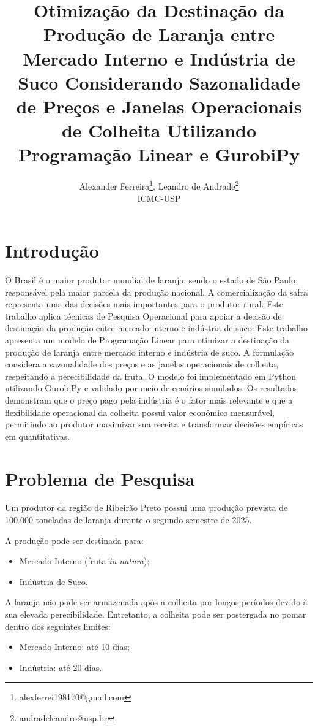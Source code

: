 \documentclass{wmecai}
\title{Otimização da Destinação da Produção de Laranja entre Mercado Interno e Indústria de Suco Considerando Sazonalidade de Preços e Janelas Operacionais de Colheita Utilizando Programação Linear e GurobiPy}
\author{
Alexander Ferreira\thanks{alexferrei198170@gmail.com}, 
Leandro de Andrade\thanks{andradeleandro@usp.br} 
\\
ICMC-USP
}
\date{}
\begin{document}
\criartitulo

\section{Introdução}
O Brasil é o maior produtor mundial de laranja, sendo o estado de São Paulo responsável pela maior parcela da produção nacional. A comercialização da safra representa uma das decisões mais importantes para o produtor rural. Este trabalho aplica técnicas de Pesquisa Operacional para apoiar a decisão de destinação da produção entre mercado interno e indústria de suco.
Este trabalho apresenta um modelo de Programação Linear para otimizar a destinação da produção de laranja entre mercado interno e indústria de suco. A formulação considera a sazonalidade dos preços e as janelas operacionais de colheita, respeitando a perecibilidade da fruta. O modelo foi implementado em Python utilizando GurobiPy e validado por meio de cenários simulados. Os resultados demonstram que o preço pago pela indústria é o fator mais relevante e que a flexibilidade operacional da colheita possui valor econômico mensurável, permitindo ao produtor maximizar sua receita e transformar decisões empíricas em quantitativas.

\section{Problema de Pesquisa}
Um produtor da região de Ribeirão Preto possui uma produção prevista de 100.000 toneladas de laranja durante o segundo semestre de 2025\cite{fundecitrus2026safra}. \\\vspace{0.cm}

A produção pode ser destinada para:

\begin{itemize}
    \item Mercado Interno (fruta \textit{in natura});
    \item Indústria de Suco.
\end{itemize}

A laranja não pode ser armazenada após a colheita por longos períodos devido à sua elevada perecibilidade. Entretanto, a colheita pode ser postergada no pomar dentro dos seguintes limites:
\begin{itemize}
    \item Mercado Interno: até 10 dias;
    \item Indústria: até 20 dias.
\end{itemize}
\end{document}
